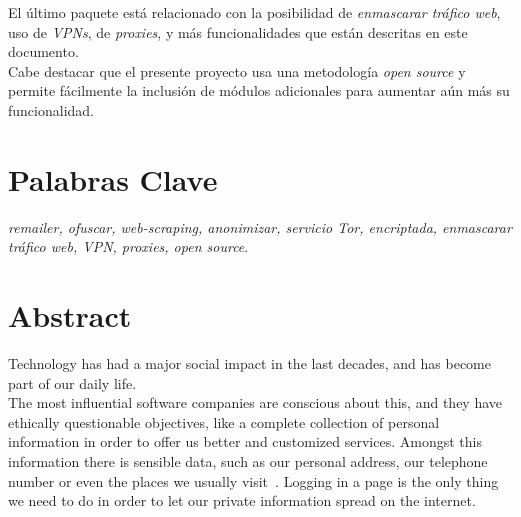 El último paquete está relacionado con la posibilidad de \textit{enmascarar tráfico web}, uso de \textit{VPNs}, de \textit{proxies}, y más funcionalidades que están descritas en este documento.\\
Cabe destacar que el presente proyecto usa una metodología \textit{open source} y permite fácilmente la inclusión de módulos adicionales para aumentar aún más su funcionalidad.\\

\section*{Palabras Clave}
\textit{remailer, ofuscar, web-scraping, anonimizar, servicio Tor, encriptada, enmascarar tráfico web, VPN, proxies, open source}.
\newpage

\section*{Abstract}
Technology has had a major social impact in the last decades, and has become part of our daily life.\\
The most influential software companies are conscious about this, and they have ethically questionable objectives, like a complete collection of personal information in order to offer us better and customized services. Amongst this information there is sensible data, such as our personal address, our telephone number or even the places we usually visit~\cite{article:google}. Logging in a page is the only thing we need to do in order to let our private information spread on the internet.

